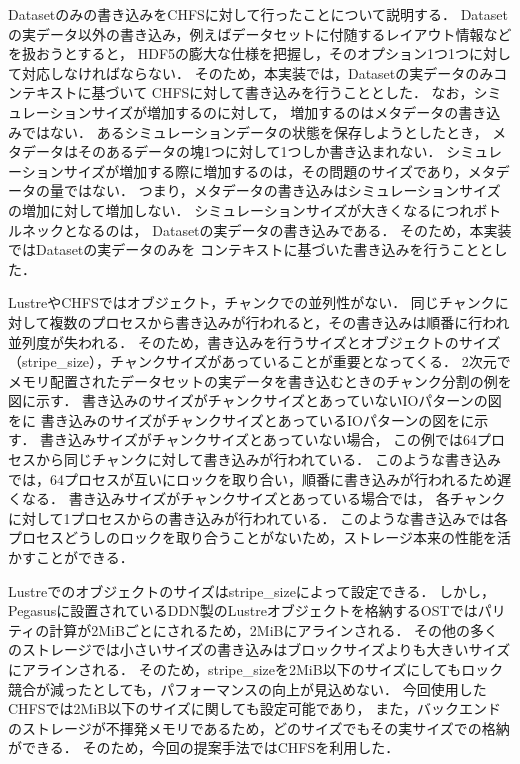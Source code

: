 \documentclass[submit,techrep,noauthor]{ipsj}
\begin{document}
Datasetのみの書き込みをCHFSに対して行ったことについて説明する．
Datasetの実データ以外の書き込み，例えばデータセットに付随するレイアウト情報などを扱おうとすると，
HDF5の膨大な仕様を把握し，そのオプション1つ1つに対して対応しなければならない．
そのため，本実装では，Datasetの実データのみコンテキストに基づいて
CHFSに対して書き込みを行うこととした．
なお，シミュレーションサイズが増加するのに対して，
増加するのはメタデータの書き込みではない．
あるシミュレーションデータの状態を保存しようとしたとき，
メタデータはそのあるデータの塊1つに対して1つしか書き込まれない．
シミュレーションサイズが増加する際に増加するのは，その問題のサイズであり，メタデータの量ではない．
つまり，メタデータの書き込みはシミュレーションサイズの増加に対して増加しない．
シミュレーションサイズが大きくなるにつれボトルネックとなるのは，
Datasetの実データの書き込みである．
そのため，本実装ではDatasetの実データのみを
コンテキストに基づいた書き込みを行うこととした．

LustreやCHFSではオブジェクト，チャンクでの並列性がない．
同じチャンクに対して複数のプロセスから書き込みが行われると，その書き込みは順番に行われ並列度が失われる．
そのため，書き込みを行うサイズとオブジェクトのサイズ（stripe\_size），チャンクサイズがあっていることが重要となってくる．
2次元でメモリ配置されたデータセットの実データを書き込むときのチャンク分割の例を図に示す．
書き込みのサイズがチャンクサイズとあっていないIOパターンの図をに
書き込みのサイズがチャンクサイズとあっているIOパターンの図をに示す．
書き込みサイズがチャンクサイズとあっていない場合，
この例では64プロセスから同じチャンクに対して書き込みが行われている．
このような書き込みでは，64プロセスが互いにロックを取り合い，順番に書き込みが行われるため遅くなる．
書き込みサイズがチャンクサイズとあっている場合では，
各チャンクに対して1プロセスからの書き込みが行われている．
このような書き込みでは各プロセスどうしのロックを取り合うことがないため，ストレージ本来の性能を活かすことができる．

Lustreでのオブジェクトのサイズはstripe\_sizeによって設定できる．
しかし，Pegasusに設置されているDDN製のLustreオブジェクトを格納するOSTではパリティの計算が2MiBごとにされるため，2MiBにアラインされる．
その他の多くのストレージでは小さいサイズの書き込みはブロックサイズよりも大きいサイズにアラインされる．
そのため，stripe\_sizeを2MiB以下のサイズにしてもロック競合が減ったとしても，パフォーマンスの向上が見込めない．
今回使用したCHFSでは2MiB以下のサイズに関しても設定可能であり，
また，バックエンドのストレージが不揮発メモリであるため，どのサイズでもその実サイズでの格納ができる．
そのため，今回の提案手法ではCHFSを利用した．
\end{document}
